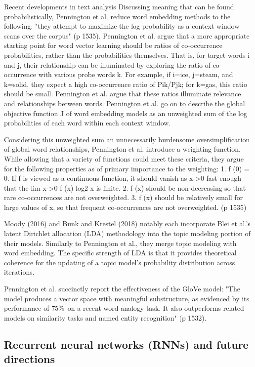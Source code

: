 \documentclass[11pt]{article}
\begin{document}
\begin{section}{Recent developments in text analysis }
Discussing meaning that can be found probabilistically, Pennington et al. reduce word embedding methods to the following: "they attempt to maximize the log probability as a context window scans over the corpus" (p 1535). Pennington et al. argue that a more appropriate starting point for word vector learning should be ratios of co-occurrence probabilities, rather than the probabilities themselves. That is, for target words i and j, their relationship can be illuminated by exploring the ratio of co-occurrence with various probe words k. For example, if i=ice, j=steam, and k=solid, they expect a high co-occurrence ratio of Pik/Pjk; for k=gas, this ratio should be small. Pennington et al. argue that these ratios illuminate relevance and relationships between words.
Pennington et al. go on to describe the global objective function J of word embedding models as an unweighted sum of the log probabilities of each word within each context window.

Considering this unweighted sum an unnecessarily burdensome oversimplification of global word relationships, Pennington et al. introduce a weighting function. While allowing that a variety of functions could meet these criteria, they argue for the following properties as of primary importance to the weighting:
1. f (0) = 0. If f is viewed as a continuous function, it should vanish as x->0 fast enough that the lim x->0 f (x) log2 x is finite.
2. f (x) should be non-decreasing so that rare co-occurrences are not overweighted.
3. f (x) should be relatively small for large values of x, so that frequent co-occurrences are not overweighted. (p 1535)

Moody (2016) and Bunk and Krestel (2018) notably each incorporate Blei et al.'s latent Dirichlet allocation (LDA) methodology into the topic modeling portion of their models. Similarly to Pennington et al., they merge topic modeling with word embedding. The specific strength of LDA is that it provides theoretical coherence for the updating of a topic model's probability distribution across iterations.

Pennington et al. succinctly report the effectiveness of the GloVe model:
"The model produces a vector space with meaningful substructure, as evidenced by its performance of 75\%\ on a recent word analogy task. It also outperforms related models on similarity tasks and named entity recognition" (p 1532).


\subsection{Recurrent neural networks (RNNs) and future directions}


\end{section}
\end{document}

